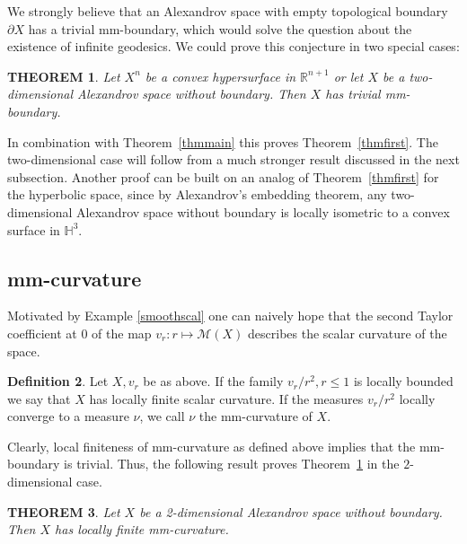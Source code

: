 \documentclass[12pt,leqno]{amsart}
\numberwithin{equation}{section}
\newtheorem{thm}{THEOREM}[section]
\theoremstyle{definition}
\newtheorem{defn}[thm]{Definition}%
\theoremstyle{remark}
\newcommand{\tref}[1]{Theorem~\ref{#1}}
\newcommand{\R}{\mathbb{R}}
\begin{document}
 We strongly believe that an Alexandrov space with empty topological boundary $\partial X$  has a trivial mm-boundary,
which would solve the question about the existence of infinite geodesics.
We could prove this conjecture in two special cases:



\begin{thm} \label{hypersurface}
Let $X^n$ be a convex hypersurface in $\R^{n+1}$  or let $X$ be a two-dimensional  Alexandrov space without boundary. Then $X$ has trivial mm-boundary.
\end{thm}


In combination with \tref{thmmain} this proves \tref{thmfirst}.
The two-dimensional case
will follow from a much stronger result discussed in the next subsection.
Another proof can be built on an analog of \tref{thmfirst} for the hyperbolic space,
since by  Alexandrov's embedding theorem, any two-dimensional Alexandrov space without boundary
is locally isometric to a convex surface in $\mathbb H^3$.



\subsection{mm-curvature}
Motivated by Example \ref{smoothscal} one can naively hope that the second Taylor coefficient at $0$ of the
map $v_r\colon r\mapsto \mathcal M(X)$ describes the scalar curvature of the space.



\begin{defn}
 Let $X,v_r$ be as above. If the family $v_r /r^2, r\leq 1$ is locally bounded we say that $X$ has locally finite  scalar curvature.
  If the measures $v_r /r^2$ locally converge to a measure $\nu$, we call $\nu$ the mm-curvature of $X$.
\end{defn}


Clearly, local finiteness of mm-curvature as defined above implies that the mm-boundary is trivial.
Thus, the following result proves \tref{hypersurface} in the $2$-dimensional case.


\begin{thm} \label{intsurface}
 Let $X$ be a 2-dimensional Alexandrov space without boundary.
 Then $X$ has locally finite mm-curvature.
\end{thm}
\end{document}
